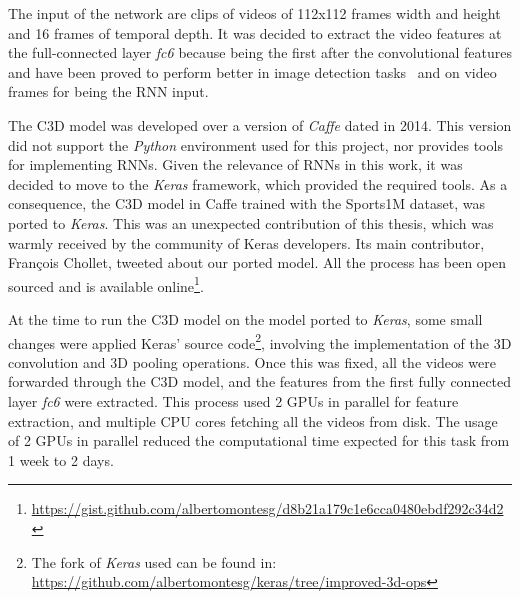 The input of the network are clips of videos of 112x112 frames width and height and 16 frames of temporal depth. It was decided to extract the video features at the full-connected layer \textit{fc6} because being the first after the convolutional features and have been proved to perform better in image detection tasks~\cite{girshick2014rich} and on video frames for being the RNN input\cite{donahue2015long}.

The C3D model \cite{tran2014learning} was developed over a version of \textit{Caffe}\cite{jia2014caffe} dated in 2014. This version did not support the \textit{Python} environment used for this project, nor provides tools for implementing RNNs. Given the relevance of RNNs in this work, it was decided to move to the \textit{Keras} framework, which provided the required tools. As a consequence, the C3D model in Caffe  trained with the Sports1M\cite{KarpathyCVPR14} dataset, was ported to \textit{Keras}. This was an unexpected contribution of this thesis, which was warmly received by the community of Keras developers. Its main contributor, François Chollet, tweeted about our ported model. All the process has been open sourced and is available online\footnote{ \url{https://gist.github.com/albertomontesg/d8b21a179c1e6cca0480ebdf292c34d2}}.


At the time to run the C3D model on the model ported to \textit{Keras}, some small changes were applied Keras' source code\footnote{The fork of \textit{Keras} used can be found in: \url{https://github.com/albertomontesg/keras/tree/improved-3d-ops}}, involving the implementation of the 3D convolution and 3D pooling operations. Once this was fixed, all the videos were forwarded through the C3D model, and the features from the first fully connected layer \textit{fc6} were extracted. This process used 2 GPUs in parallel for feature extraction, and multiple CPU cores fetching all the videos from disk. The usage of 2 GPUs in parallel reduced the computational time expected for this task from 1 week to 2 days.


